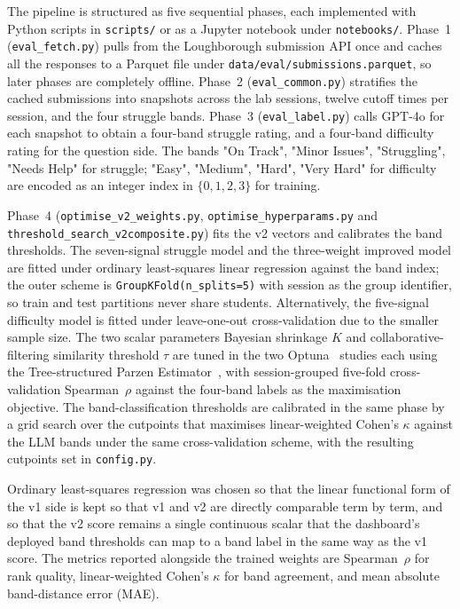 The pipeline is structured as five sequential phases, each implemented with Python scripts in \texttt{scripts/} or as a Jupyter notebook under \texttt{notebooks/}.
Phase~1 (\texttt{eval\_fetch.py}) pulls from the Loughborough submission API once and caches all the responses to a Parquet file under \texttt{data/eval/submissions.parquet}, so later phases are completely offline.
Phase~2 (\texttt{eval\_common.py}) stratifies the cached submissions into snapshots across the lab sessions, twelve cutoff times per session, and the four struggle bands.
Phase~3 (\texttt{eval\_label.py}) calls GPT-4o for each snapshot to obtain a four-band struggle rating, and a four-band difficulty rating for the question side.
The bands "On Track", "Minor Issues", "Struggling", "Needs Help" for struggle; "Easy", "Medium", "Hard", "Very Hard" for difficulty are encoded as an integer index in $\{0, 1, 2, 3\}$ for training.

Phase~4 (\texttt{optimise\_v2\_weights.py}, \texttt{optimise\_hyperparams.py} and \texttt{threshold\_search\_v2composite.py}) fits the v2 vectors and calibrates the band thresholds. The seven-signal struggle model and the three-weight improved model are fitted under ordinary least-squares linear regression against the band index; the outer scheme is \texttt{GroupKFold(n\_splits=5)} with session as the group identifier, so train and test partitions never share students.
Alternatively, the five-signal difficulty model is fitted under leave-one-out cross-validation due to the smaller sample size.
The two scalar parameters Bayesian shrinkage $K$ and collaborative-filtering similarity threshold $\tau$ are tuned in the two Optuna~\cite{akibaOptunaNextgenerationHyperparameter2019} studies each using the Tree-structured Parzen Estimator~\cite{NIPS2011_86e8f7ab}, with session-grouped five-fold cross-validation Spearman~$\rho$ against the four-band labels as the maximisation objective.
The band-classification thresholds are calibrated in the same phase by a grid search over the cutpoints that maximises linear-weighted Cohen's $\kappa$ against the LLM bands under the same cross-validation scheme, with the resulting cutpoints set in \texttt{config.py}.

Ordinary least-squares regression was chosen so that the linear functional form of the v1 side is kept so that v1 and v2 are directly comparable term by term, and so that the v2 score remains a single continuous scalar that the dashboard's deployed band thresholds can map to a band label in the same way as the v1 score.
The metrics reported alongside the trained weights are Spearman~$\rho$ for rank quality, linear-weighted Cohen's $\kappa$ for band agreement, and mean absolute band-distance error (MAE).


